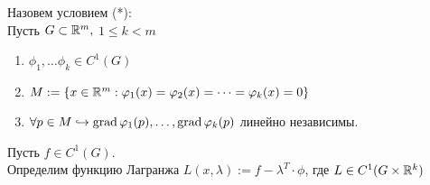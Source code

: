 
\begin{note}
    Назовем условием (*): \\
    Пусть $G \subset \mathbb{R}^m, $ $1 \leq k < m$
    \begin{enumerate}
        \item $\phi_1, \dots \phi_k \in C^1(G)$
        \item $M := \{ x \in \mathbb{R}^m : \varphi_1(x)=\varphi_2(x)=\dots=\varphi_k(x)=0 \}$
        \item $\forall p \in M \hookrightarrow  \operatorname{grad} \varphi_1(p), \dots, \operatorname{grad} \varphi_k(p) $ линейно независимы.
    \end{enumerate}
\end{note}

\begin{definition}
    Пусть $f \in C^1(G)$. \\Определим функцию Лагранжа $L(x, \lambda) := f - \lambda^T \cdot \phi$, где $L \in C^1(G \times \mathbb{R}^k)$
\end{definition}

